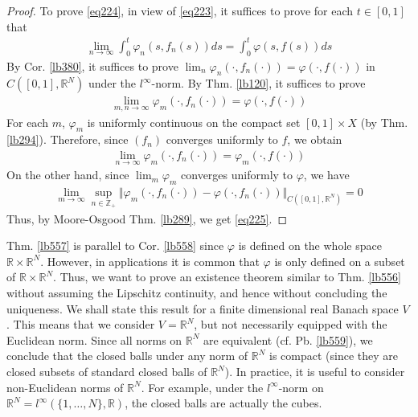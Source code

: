 \documentclass[12pt,b5paper,notitlepage]{article}
\theoremstyle{definition}
\theoremstyle{plain}
\newcommand{\Zbb}{\mathbb Z}
\newcommand{\Rbb}{\mathbb R}
\numberwithin{equation}{section}
\begin{document}
\begin{proof}
To prove \eqref{eq224}, in view of \eqref{eq223}, it suffices to prove for each $t\in[0,1]$ that
\begin{align*}
\lim_{n\rightarrow\infty}\int_0^t\varphi_n(s,f_n(s))ds=\int_0^t\varphi(s,f(s))ds
\end{align*}
By Cor. \ref{lb380}, it suffices to prove $\lim_n \varphi_n(\cdot,f_n(\cdot))=\varphi(\cdot,f(\cdot))$ in $C([0,1],\Rbb^N)$ under the $l^\infty$-norm. By Thm. \ref{lb120}, it suffices to prove
\begin{align}\label{eq225}
\lim_{m,n\rightarrow\infty} \varphi_m(\cdot,f_n(\cdot))=\varphi(\cdot,f(\cdot)) 
\end{align}
For each $m$, $\varphi_m$ is uniformly continuous on the compact set $[0,1]\times X$ (by Thm. \ref{lb294}). Therefore, since $(f_n)$ converges uniformly to $f$, we obtain
\begin{align*}
\lim_{n\rightarrow\infty}\varphi_m(\cdot,f_n(\cdot))=\varphi_m(\cdot,f(\cdot))
\end{align*}
On the other hand, since $\lim_m\varphi_m$ converges uniformly to $\varphi$, we have
\begin{align*}
\lim_{m\rightarrow\infty}\sup_{n\in\Zbb_+} \big\Vert \varphi_m(\cdot,f_n(\cdot))-\varphi(\cdot,f_n(\cdot))\big\Vert_{C([0,1],\Rbb^N)}=0
\end{align*}
Thus, by Moore-Osgood Thm. \ref{lb289}, we get \eqref{eq225}.
\end{proof}



Thm. \ref{lb557} is parallel to Cor. \ref{lb558} since $\varphi$ is defined on the whole space $\Rbb\times\Rbb^N$. However, in applications it is common that $\varphi$ is only defined on a subset of $\Rbb\times\Rbb^N$. Thus, we want to prove an existence theorem similar to Thm. \ref{lb556} without assuming the Lipschitz continuity, and hence without concluding the uniqueness. We shall state this result for a finite dimensional real Banach space $V$. This means that we consider $V=\Rbb^N$, but not necessarily equipped with the Euclidean norm. Since all norms on $\Rbb^N$ are equivalent (cf. Pb. \ref{lb559}), we conclude that the closed balls under any norm of $\Rbb^N$ is compact (since they are closed subsets of standard closed balls of $\Rbb^N$). In practice, it is useful to consider non-Euclidean norms of $\Rbb^N$. For example, under the $l^\infty$-norm on $\Rbb^N=l^\infty(\{1,\dots,N\},\Rbb)$, the closed balls are actually the cubes. 
\end{document}
